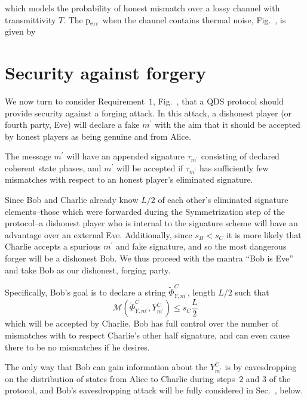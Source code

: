 \noindent which models the probability of honest mismatch over a lossy channel with transmittivity $T$. The $\text{p}_{\text{err}}$ when the channel contains thermal noise, Fig.~, is given by 

\section{Security against forgery}
We now turn to consider Requirement~$1$, Fig.~, that a QDS protocol should provide security against a forging attack. In this attack, a dishonest player (or fourth party, Eve) will declare a fake $m^\prime$ with the aim that it should be accepted by honest players as being genuine and from Alice. 

The message $m^\prime$ will have an appended signature $\tau_{m^\prime}$ consisting of declared coherent state phases, and $m^\prime$ will be accepted if $\tau_{m^\prime}$ has sufficiently few mismatches with respect to an honest player's eliminated signature. 


Since Bob and Charlie already know $L/2$ of each other's eliminated signature elements--those which were forwarded during the Symmetrization step of the protocol--a dishonest player who is internal to the signature scheme will have an advantage over an external Eve. Additionally, since $s_B < s_C$ it is more likely that Charlie accepts a spurious $m^\prime$ and fake signature, and so the most dangerous forger will be a dishonest Bob. We thus proceed with the mantra ``Bob is Eve'' and take Bob as our dishonest, forging party. 

Specifically, Bob's goal is to declare a string $\tilde{\Phi}^C_{Y, m^\prime}$, length $L/2$ such that 
\begin{equation}\label{eqn:forging_condition}
\mathcal{M}\left(\tilde{\Phi}^C_{Y, m^\prime}, Y_{m^\prime}^C\right) \le s_C \frac{L}{2}
\end{equation}
which will be accepted by Charlie. Bob has full control over the number of mismatches with to respect Charlie's other half signature, and can even cause there to be no mismatches if he desires.

The only way that Bob can gain information about the $Y_{m^\prime}^C$ is by eavesdropping on the distribution of states from Alice to Charlie during steps~$2$ and $3$ of the protocol, and Bob's eavesdropping attack will be fully considered in Sec.~, below.

